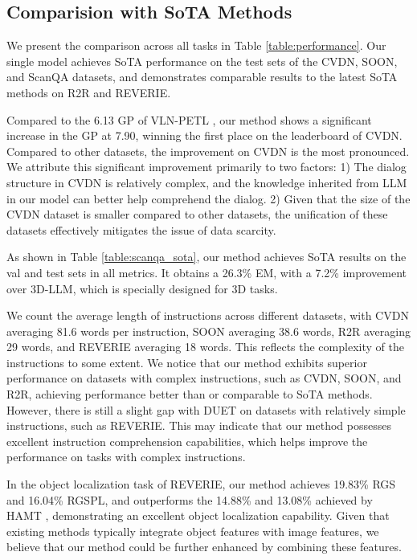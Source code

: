 \subsection{Comparision with SoTA Methods}
\label{sec:performance}

We present the comparison across all tasks in Table \ref{table:performance}.
Our single model achieves SoTA performance on the test sets of the CVDN, SOON, and ScanQA datasets, and demonstrates comparable results to the latest SoTA methods on R2R and REVERIE.



Compared to the 6.13 GP of VLN-PETL \cite{qiao2023vln}, our method shows a significant increase in the GP at 7.90, winning the first place on the leaderboard of CVDN.
Compared to other datasets, the improvement on CVDN is the most pronounced. 
We attribute this significant improvement primarily to two factors: 1) The dialog structure in CVDN is relatively complex, and the knowledge inherited from LLM in our model can better help comprehend the dialog. 2) Given that the size of the CVDN dataset is smaller compared to other datasets, the unification of these datasets effectively mitigates the issue of data scarcity.


 As shown in Table \ref{table:scanqa_sota}, our method achieves SoTA results on the val and test sets in all metrics.
It obtains a 26.3\% EM, with a 7.2\% improvement over 3D-LLM, which is specially designed for 3D tasks.

We count the average length of instructions across different datasets, with CVDN averaging 81.6 words per instruction, SOON averaging 38.6 words, R2R averaging 29 words, and REVERIE averaging 18 words. 
This reflects the complexity of the instructions to some extent.
We notice that our method exhibits superior performance on datasets with complex instructions, such as CVDN, SOON, and R2R, achieving performance better than or comparable to SoTA methods.
However, there is still a slight gap with DUET on datasets with relatively simple instructions, such as REVERIE.
This may indicate that our method possesses excellent instruction comprehension capabilities, which helps improve the performance on tasks with complex instructions.

In the object localization task of REVERIE, our method achieves 19.83\% RGS and 16.04\% RGSPL, and outperforms the 14.88\% and 13.08\% achieved by HAMT \cite{NEURIPS2021_2e5c2cb8}, demonstrating an excellent object localization capability. 
Given that existing methods typically integrate object features with image features, we believe that our method could be further enhanced by combining these features.


